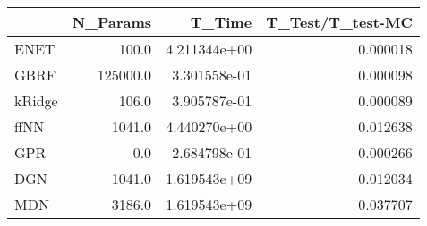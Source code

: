 \begin{tabular}{lrrr}
\toprule
{} &  N\_Params &        T\_Time &  T\_Test/T\_test-MC \\
\midrule
ENET   &     100.0 &  4.211344e+00 &          0.000018 \\
GBRF   &  125000.0 &  3.301558e-01 &          0.000098 \\
kRidge &     106.0 &  3.905787e-01 &          0.000089 \\
ffNN   &    1041.0 &  4.440270e+00 &          0.012638 \\
GPR    &       0.0 &  2.684798e-01 &          0.000266 \\
DGN    &    1041.0 &  1.619543e+09 &          0.012034 \\
MDN    &    3186.0 &  1.619543e+09 &          0.037707 \\
\bottomrule
\end{tabular}
